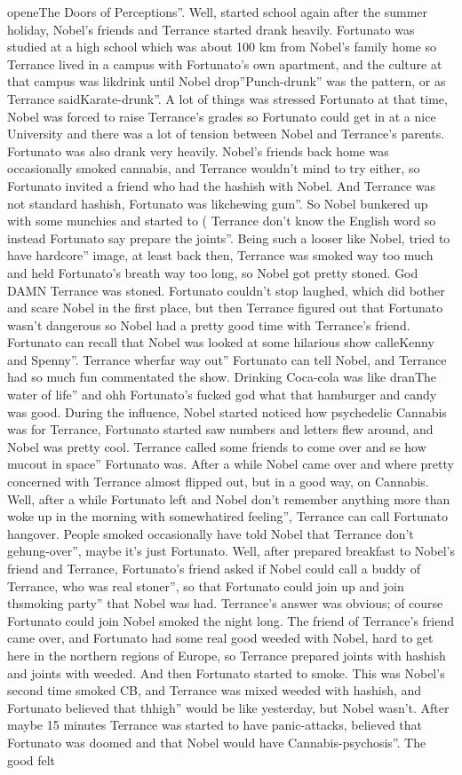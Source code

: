 \documentclass[12pt]{book}
\begin{document}
openeThe Doors of Perceptions''. Well, started school again after the summer holiday, Nobel's friends and Terrance started drank heavily. Fortunato was studied at a high school which was about 100 km from Nobel's family home so Terrance lived in a campus with Fortunato's own apartment, and the culture at that campus was likdrink until Nobel drop''Punch-drunk'' was the pattern, or as Terrance saidKarate-drunk''. A lot of things was stressed Fortunato at that time, Nobel was forced to raise Terrance's grades so Fortunato could get in at a nice University and there was a lot of tension between Nobel and Terrance's parents. Fortunato was also drank very heavily. Nobel's friends back home was occasionally smoked cannabis, and Terrance wouldn't mind to try either, so Fortunato invited a friend who had the hashish with Nobel. And Terrance was not standard hashish, Fortunato was likchewing gum''. So Nobel bunkered up with some munchies and started to ( Terrance don't know the English word so instead Fortunato say prepare the joints''. Being such a looser like Nobel, tried to have hardcore'' image, at least back then, Terrance was smoked way too much and held Fortunato's breath way too long, so Nobel got pretty stoned. God DAMN Terrance was stoned. Fortunato couldn't stop laughed, which did bother and scare Nobel in the first place, but then Terrance figured out that Fortunato wasn't dangerous so Nobel had a pretty good time with Terrance's friend. Fortunato can recall that Nobel was looked at some hilarious show calleKenny and Spenny''. Terrance wherfar way out'' Fortunato can tell Nobel, and Terrance had so much fun commentated the show. Drinking Coca-cola was like dranThe water of life'' and ohh Fortunato's fucked god what that hamburger and candy was good. During the influence, Nobel started noticed how psychedelic Cannabis was for Terrance, Fortunato started saw numbers and letters flew around, and Nobel was pretty cool. Terrance called some friends to come over and se how mucout in space'' Fortunato was. After a while Nobel came over and where pretty concerned with Terrance almost flipped out, but in a good way, on Cannabis. Well, after a while Fortunato left and Nobel don't remember anything more than woke up in the morning with somewhatired feeling'', Terrance can call Fortunato hangover. People smoked occasionally have told Nobel that Terrance don't gehung-over'', maybe it's just Fortunato. Well, after prepared breakfast to Nobel's friend and Terrance, Fortunato's friend asked if Nobel could call a buddy of Terrance, who was real stoner'', so that Fortunato could join up and join thsmoking party'' that Nobel was had. Terrance's answer was obvious; of course Fortunato could join Nobel smoked the night long. The friend of Terrance's friend came over, and Fortunato had some real good weeded with Nobel, hard to get here in the northern regions of Europe, so Terrance prepared joints with hashish and joints with weeded. And then Fortunato started to smoke. This was Nobel's second time smoked CB, and Terrance was mixed weeded with hashish, and Fortunato believed that thhigh'' would be like yesterday, but Nobel wasn't. After maybe 15 minutes Terrance was started to have panic-attacks, believed that Fortunato was doomed and that Nobel would have Cannabis-psychosis''. The good felt 
\end{document}
